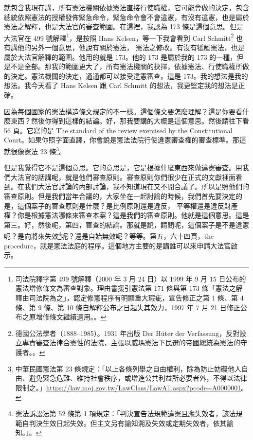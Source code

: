\hypertarget{w05:cue:35}{}就包含我現在講，所有憲法機關依據憲法直接行使職權，它可能會做的決定，包含總統依照憲法的授權發佈緊急命令，緊急命令會不會違憲，有沒有違憲，也是屬於憲法之解釋，也是大法官的審查範圍。在這裡，我認為 173 條是這個意思。但是大法官在 499 號解釋\footnote{司法院釋字第 499 號解釋（2000 年 3 月 24 日）以 1999 年 9 月 15 日公布的憲法增修條文為審查對象。理由書援引憲法第 171 條與第 173 條「憲法之解釋由司法院為之」，認定修憲程序有明顯重大瑕疵，宣告修正之第 1 條、第 4 條、第 9 條、第 10 條自解釋公布之日起失其效力，1997 年 7 月 21 日修正公布之原增修條文繼續適用。\cite{jy499}。}，是按照 Hans Kelsen，等一下我會看到 Carl Schmitt\footnote{德國公法學者（1888–1985）。1931 年出版 Der Hüter der Verfassung，反對設立專責審查法律合憲性的法院，主張以威瑪憲法下民選的帝國總統為憲法的守護者。\cite{schmitt2015}。} 也有講他的另外一個意思，他說有關於憲法，
\hypertarget{w05:cue:36}{}憲法之修改。有沒有牴觸憲法，也是屬於大法官解釋的範圍。他用的就是 173。他的 173 是屬於我的 173 的一種，但是不是全部。那我的範圍更大了，所有憲法機關的抉擇，依據憲法、行使職權所做的決定。憲法機關的決定，通通都可以接受違憲審查。這是 173。我的想法是我的想法。我今天看了 Hans Kelsen 跟 Carl Schmitt 的想法，我更堅定我的想法是正確。

\hypertarget{w05:cue:37}{}因為每個國家的憲法構造條文規定的不一樣。這個條文要怎麼理解？這是你要看什麼東西？然後你得到這樣的結論。好，那我要講的大概是這個意思。然後請往下看 56 頁。它寫的是 The standard of the review exercised by the Constitutional Court。如果你照字面直譯，你會說是憲法法院行使違憲審查權的審查標準。那這就很像憲法 23 條\footnote{中華民國憲法第 23 條規定：「以上各條列舉之自由權利，除為防止妨礙他人自由、避免緊急危難、維持社會秩序，或增進公共利益所必要者外，不得以法律限制之。」\url{https://law.moj.gov.tw/LawClass/LawAll.aspx?pcode=A0000001}。}。

\hypertarget{w05:cue:38}{}但是我覺得它不是這個意思。它的意思是，它是根據什麼東西來做違憲審查。用我們大法官的話講呢，就是他們審查原則。審查原則你們很少在正式的文獻裡面看到。在我們大法官討論的內部討論，我不知道現在又不開合議了。所以是照他們的審查原則。但是我們當年合議的，大家坐在一起討論的時候，我們首先要決定的是，這個案子的審查原則是什麼？是比例原則還是違反，
\hypertarget{w05:cue:39}{}平等權還是違反財產權？你是根據憲法哪條來審查本案？這是我們的審查原則。他就是這個意思。這是第三。好，然後呢，第四，審查的結論。那就是說，請問呢，這個案子是不是違憲呢？是向將來失效\footnote{憲法訴訟法第 52 條第 1 項規定：「判決宣告法規範違憲且應失效者，該法規範自判決生效日起失效。但主文另有諭知溯及失效或定期失效者，依其諭知。」\cite{csfa}。}呢？還是自始無效呢？等等。第五，六十四頁，the procedure，就是憲法法庭的程序。這個地方主要的是講誰可以來申請大法官啟示。

